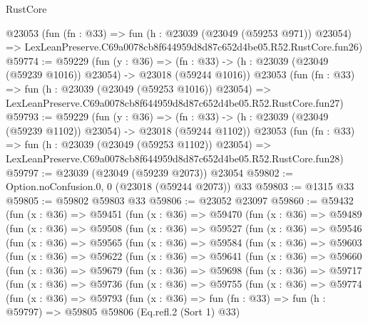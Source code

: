 \begin{lexlean}{RustCore}
\begin{coremodule}
    @23053
    (fun (fn : @33) =>
    fun (h : @23039 (@23049 (@59253 @971)) @23054) =>
    LexLeanPreserve.C69a0078cb8f644959d8d87c652d4be05.R52.RustCore.fun26)
@59774 := @59229
    (fun (y : @36) =>
    (fn : @33) -> (h : @23039 (@23049 (@59239 @1016)) @23054) -> @23018 (@59244 @1016))
    @23053
    (fun (fn : @33) =>
    fun (h : @23039 (@23049 (@59253 @1016)) @23054) =>
    LexLeanPreserve.C69a0078cb8f644959d8d87c652d4be05.R52.RustCore.fun27)
@59793 := @59229
    (fun (y : @36) =>
    (fn : @33) -> (h : @23039 (@23049 (@59239 @1102)) @23054) -> @23018 (@59244 @1102))
    @23053
    (fun (fn : @33) =>
    fun (h : @23039 (@23049 (@59253 @1102)) @23054) =>
    LexLeanPreserve.C69a0078cb8f644959d8d87c652d4be05.R52.RustCore.fun28)
@59797 := @23039 (@23049 (@59239 @2073)) @23054
@59802 := Option.noConfusion.{0, 0} (@23018 (@59244 @2073)) @33
@59803 := @1315 @33
@59805 := @59802 @59803 @33
@59806 := @23052 @23097
@59860 := @59432
    (fun (x : @36) =>
    @59451
      (fun (x : @36) =>
      @59470
        (fun (x : @36) =>
        @59489
          (fun (x : @36) =>
          @59508
            (fun (x : @36) =>
            @59527
              (fun (x : @36) =>
              @59546
                (fun (x : @36) =>
                @59565
                  (fun (x : @36) =>
                  @59584
                    (fun (x : @36) =>
                    @59603
                      (fun (x : @36) =>
                      @59622
                        (fun (x : @36) =>
                        @59641
                          (fun (x : @36) =>
                          @59660
                            (fun (x : @36) =>
                            @59679
                              (fun (x : @36) =>
                              @59698
                                (fun (x : @36) =>
                                @59717
                                  (fun (x : @36) =>
                                  @59736
                                    (fun (x : @36) =>
                                    @59755
                                      (fun (x : @36) =>
                                      @59774
                                        (fun (x : @36) =>
                                        @59793
                                          (fun (x : @36) =>
                                          fun (fn : @33) =>
                                          fun (h : @59797) =>
                                          @59805
                                            @59806
                                            (Eq.refl.{2} (Sort 1) @33)

\end{coremodule}
\end{lexlean}
